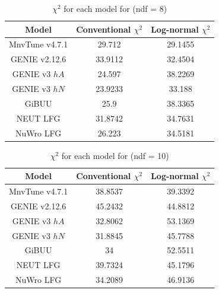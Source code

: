 \documentclass[aps,prl,twocolumn,showpacs,superscriptaddress,letterpaper,showkeys,superscriptaddress,floatfix,nofootinbib]{revtex4-1}
\begin{document}
\begin{table}[H]
  \centering
  \renewcommand{\arraystretch}{1.15}
  \caption{$\chi^2$ for each model for \pmu (ndf = 8)}
    \begin{tabular}{c||c|c}
        Model & Conventional $\chi^2$ & Log-normal $\chi^2$ \\
        \hline
        \hline
        MnvTune v4.7.1 & 29.712 & 29.1455\\
        GENIE v2.12.6 & 33.9112 & 32.4504\\
        GENIE v3 $hA$  & 24.597 & 38.2269\\
        GENIE v3 $hN$  & 23.9233 & 33.188\\
        GiBUU & 25.9 & 38.3365\\
        NEUT LFG & 31.8742 & 34.7631\\
        NuWro LFG & 26.223 & 34.5181\\
    \end{tabular}
  \label{tbl:chi2_pmu}
\end{table}

\begin{table}[H]
  \centering
  \renewcommand{\arraystretch}{1.15}
  \caption{$\chi^2$ for each model for \pzmu (ndf = 10)}
    \begin{tabular}{c||c|c}
        Model & Conventional $\chi^2$ & Log-normal $\chi^2$ \\
  	    \hline
  	    \hline
        MnvTune v4.7.1 & 38.8537 & 39.3392\\
        GENIE v2.12.6 & 45.2432 & 44.8812\\
        GENIE v3 $hA$  & 32.8062 & 53.1369\\
        GENIE v3 $hN$  & 31.8845 & 45.7788\\
        GiBUU & 34 & 52.5511\\
        NEUT LFG & 39.7324 & 45.1796\\
        NuWro LFG & 34.2089 & 46.9136\\
    \end{tabular}
  \label{tbl:chi2_pzmu}
\end{table}
\end{document}
